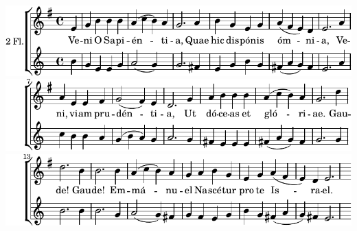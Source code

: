 \includegraphics{c2ce76cf7fa74ca432cfbed029f5ee09-1}%
\ifx\betweenLilyPondSystem \undefined
  \linebreak
\else
  \expandafter{}%
\fi
\includegraphics{c2ce76cf7fa74ca432cfbed029f5ee09-2}%
\ifx\betweenLilyPondSystem \undefined
  \linebreak
\else
  \expandafter{}%
\fi
\includegraphics{c2ce76cf7fa74ca432cfbed029f5ee09-3}%
